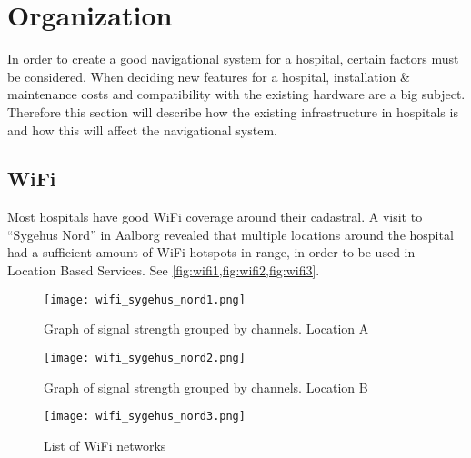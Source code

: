 \section{Organization} %
\label{sec:organization}





In order to create a good navigational system for a hospital, certain factors must be considered. When deciding new features for a hospital, installation \& maintenance costs and compatibility with the existing hardware are a big subject. Therefore this section will describe how the existing infrastructure in hospitals is and how this will affect the navigational system.

\subsection{WiFi}

Most hospitals have good WiFi coverage around their cadastral. A visit to \enquote{Sygehus Nord} in Aalborg revealed that multiple locations around the hospital had a sufficient amount of WiFi hotspots in range, in order to be used in Location Based Services. See \cref{fig:wifi1,fig:wifi2,fig:wifi3}.

\begin{figure}
\centering
  \begin{minipage}{0.45\textwidth}
    \centering
    \texttt{[image: wifi\_sygehus\_nord1.png]}
    \caption{Graph of signal strength grouped by channels. Location A} \label{fig:wifi1}
  \end{minipage}
  \hfill
  \begin{minipage}{0.45\textwidth}
    \centering
    \texttt{[image: wifi\_sygehus\_nord2.png]}
    \caption{Graph of signal strength grouped by channels. Location B} \label{fig:wifi2}
  \end{minipage}
    \begin{minipage}{0.45\textwidth}
    \centering
    \texttt{[image: wifi\_sygehus\_nord3.png]}
    \caption{List of WiFi networks} \label{fig:wifi3}
  \end{minipage}
  \end{figure}


